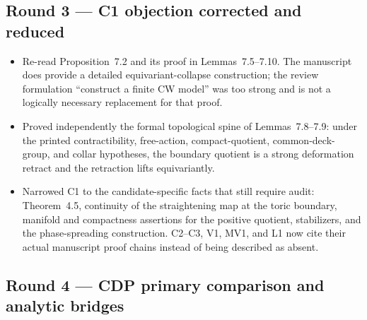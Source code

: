 \subsection*{Round 3 --- C1 objection corrected and reduced}

\begin{itemize}[leftmargin=1.8em]
\item Re-read Proposition~7.2 and its proof in Lemmas~7.5--7.10.  The
manuscript does provide a detailed equivariant-collapse construction; the
review formulation ``construct a finite CW model'' was too strong and is not
a logically necessary replacement for that proof.
\item Proved independently the formal topological spine of Lemmas~7.8--7.9:
under the printed contractibility, free-action, compact-quotient, common-deck-
group, and collar hypotheses, the boundary quotient is a strong deformation
retract and the retraction lifts equivariantly.
\item Narrowed C1 to the candidate-specific facts that still require audit:
Theorem~4.5, continuity of the straightening map at the toric boundary,
manifold and compactness assertions for the positive quotient, stabilizers,
and the phase-spreading construction.  C2--C3, V1, MV1, and L1 now cite their
actual manuscript proof chains instead of being described as absent.
\end{itemize}

\subsection*{Round 4 --- CDP primary comparison and analytic bridges}

